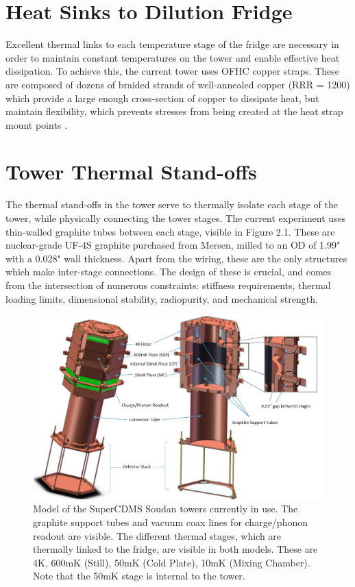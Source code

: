 \documentclass{report}
\begin{document}
\section{Heat Sinks to Dilution Fridge}

Excellent thermal links to each temperature stage of the fridge are necessary in order to maintain constant temperatures on the tower and enable effective heat dissipation. To achieve this, the current tower uses OFHC copper straps. These are composed of dozens of braided strands of well-annealed copper (RRR = 1200) which provide a large enough cross-section of copper to dissipate heat, but maintain flexibility, which prevents stresses from being created at the heat strap mount points \cite{Stockwell1996}.


\section{Tower Thermal Stand-offs}

The thermal stand-offs in the tower serve to thermally isolate each stage of the tower, while physically connecting the tower stages. The current experiment uses thin-walled graphite tubes between each stage, visible in Figure 2.1. These are nuclear-grade UF-4S graphite purchased from Mersen, milled to an OD of 1.99" with a 0.028" wall thickness. Apart from the wiring, these are the only structures which make inter-stage connections. The design of these is crucial, and comes from the intersection of numerous constraints: stiffness requirements, thermal loading limits, dimensional stability, radiopurity, and mechanical strength.

\begin{figure}[h]
\centering
\includegraphics[width = .75\textwidth]{Labelled_tower.png}
\caption{Model of the SuperCDMS Soudan towers currently in use. The graphite support tubes and vacuum coax lines for charge/phonon readout are visible. The different thermal stages, which are thermally linked to the fridge, are visible in both models. These are 4K, 600mK (Still), 50mK (Cold Plate), 10mK (Mixing Chamber). Note that the 50mK stage is internal to the tower.}
\end{figure}
\end{document}
